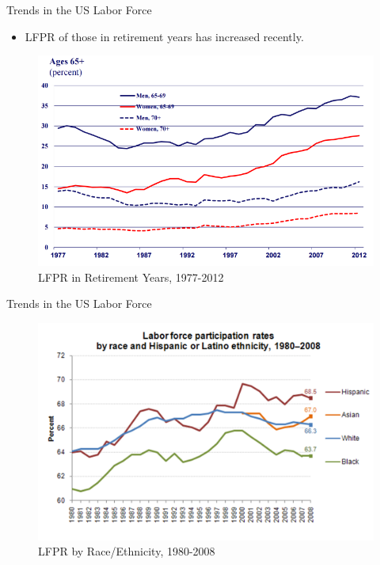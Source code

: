 \documentclass[xcolor={dvipsnames},pdf, hyperref={colorlinks=true, citecolor=ForestGreen, linkcolor=BlueViolet, urlcolor=Magenta}]{beamer}
\theoremstyle{definition}
\begin{document}
	\begin{frame}{Trends in the US Labor Force}
	\begin{itemize}
		\item LFPR of those in retirement years has increased recently.
	\end{itemize}
	\begin{figure}
		\centering
		\includegraphics[scale=.8]{01B_15.png}
		\caption{LFPR in Retirement Years, 1977-2012}
	\end{figure}
\end{frame}


	\begin{frame}{Trends in the US Labor Force}
	\begin{figure}
		\centering
		\includegraphics[scale=.6]{01B_7.png}
		\caption{LFPR by Race/Ethnicity, 1980-2008}
		\item 
	\end{figure}
	
\end{frame}
\end{document}
